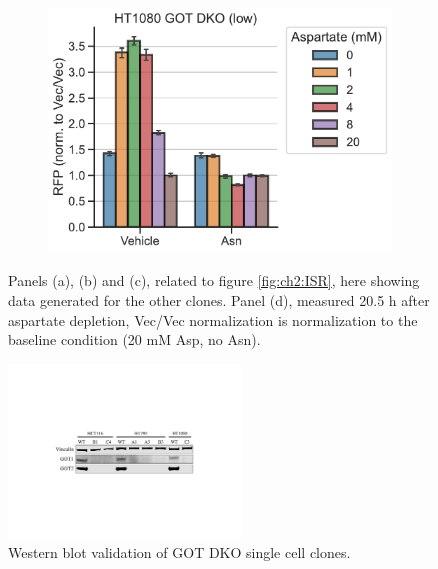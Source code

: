 \begin{figure}[ht]
\begin{subfigure}[b]{0.4\textwidth}
         \caption{}
         \label{fig:app_ch2:HT1080_Atp_ATF4rep}
     \end{subfigure}
     \hspace{0.06\textwidth}
     \begin{subfigure}[b]{0.4\textwidth}
         \includegraphics[width=\textwidth]{figures/chap2/app/HT1080_GOT_DKO_Asp_ATF4rep.pdf}
         \caption{}
         \label{fig:app_ch2:HT1080_GOT_DKO_Asp_ATF4rep}
     \end{subfigure}
        \caption[Mito inhibitor induced ATF4 is rescued by Asn, other clones.]{
        Panels (a), (b) and (c), related to figure \ref{fig:ch2:ISR}, here showing data generated for the other clones.
        Panel (d), measured 20.5 h after aspartate depletion, Vec/Vec normalization is normalization to the baseline condition (20 mM Asp, no Asn).
        }
        \label{fig:app_ch2:ISR}
\end{figure}

\begin{figure}[ht]
    \centering
    \includegraphics[width=0.55\textwidth]{figures/chap2/app/GOT_DKO_western.pdf}
    \caption[GOT DKO western blot validation.]{
    Western blot validation of GOT DKO single cell clones.
    }
    \label{fig:app_ch2:GOT_DKO_western}
\end{figure}




